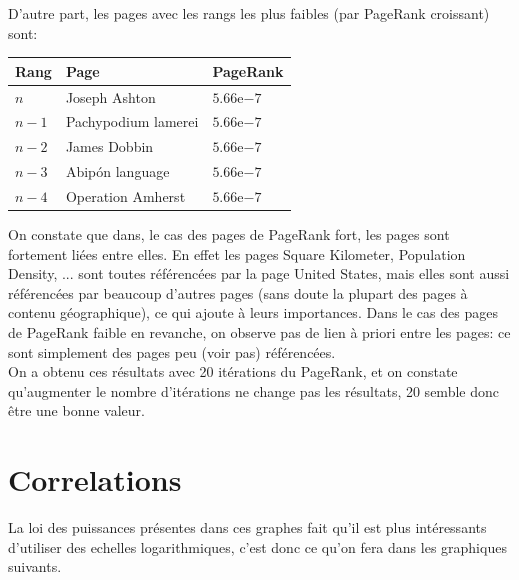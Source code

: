 \documentclass[a4paper]{report}
\begin{document}
D'autre part, les pages avec les rangs les plus faibles (par PageRank croissant) sont:

\begin{center}
  \begin{tabular}{|l|l|l|}
    \hline
    Rang & Page & PageRank\\
    \hline
    $n$ & Joseph Ashton & $5.66\mathrm{e}{-7}$\\
    $n-1$ & Pachypodium lamerei & $5.66\mathrm{e}{-7}$\\
    $n-2$ & James Dobbin & $5.66\mathrm{e}{-7}$\\
    $n-3$ & Abipón language & $5.66\mathrm{e}{-7}$\\
    $n-4$ & Operation Amherst & $5.66\mathrm{e}{-7}$\\
    \hline
  \end{tabular}
\end{center}

On constate que dans, le cas des pages de PageRank fort, les pages sont fortement liées entre elles. En effet les pages Square Kilometer, Population Density, ... sont toutes référencées par la page United States, mais elles sont aussi référencées par beaucoup d'autres pages (sans doute la plupart des pages à contenu géographique), ce qui ajoute à leurs importances. Dans le cas des pages de PageRank faible en revanche, on observe pas de lien à priori entre les pages: ce sont simplement des pages peu (voir pas) référencées.\\

On a obtenu ces résultats avec 20 itérations du PageRank, et on constate qu'augmenter le nombre d'itérations ne change pas les résultats, 20 semble donc être une bonne valeur.

\section{Correlations}

La loi des puissances présentes dans ces graphes fait qu'il est plus intéressants d'utiliser des echelles logarithmiques, c'est donc ce qu'on fera dans les graphiques suivants.
\end{document}

